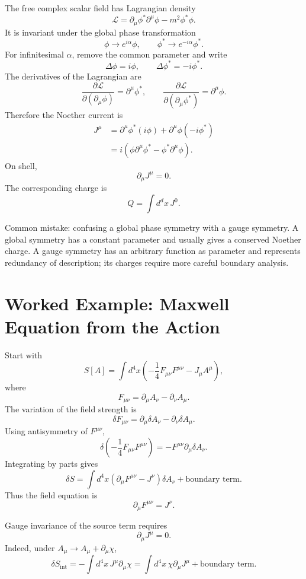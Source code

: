 The free complex scalar field has Lagrangian density
\[
    \mathcal{L}=\partial_\mu\phi^*\partial^\mu\phi-m^2\phi^*\phi.
\]
It is invariant under the global phase transformation
\[
    \phi\longrightarrow e^{i\alpha}\phi,
    \qquad
    \phi^*\longrightarrow e^{-i\alpha}\phi^*.
\]
For infinitesimal \(\alpha\), remove the common parameter and write
\[
    \Delta\phi=i\phi,
    \qquad
    \Delta\phi^*=-i\phi^*.
\]
The derivatives of the Lagrangian are
\[
    \frac{\partial\mathcal{L}}{\partial(\partial_\mu\phi)}=\partial^\mu\phi^*,
    \qquad
    \frac{\partial\mathcal{L}}{\partial(\partial_\mu\phi^*)}=\partial^\mu\phi.
\]
Therefore the Noether current is
\[
\begin{aligned}
    J^\mu
    &=\partial^\mu\phi^*(i\phi)+\partial^\mu\phi(-i\phi^*) \\
    &=i(\phi\partial^\mu\phi^*-\phi^*\partial^\mu\phi).
\end{aligned}
\]
On shell,
\[
    \partial_\mu J^\mu=0.
\]
The corresponding charge is
\[
    Q=\int d^d x\,J^0.
\]

\begin{remarkbox}
Common mistake: confusing a global phase symmetry with a gauge symmetry. A global
symmetry has a constant parameter and usually gives a conserved Noether charge. A
gauge symmetry has an arbitrary function as parameter and represents redundancy
of description; its charges require more careful boundary analysis.
\end{remarkbox}

\section{Worked Example: Maxwell Equation from the Action}

Start with
\[
    S[A]=\int d^4x\left(-\frac{1}{4}F_{\mu\nu}F^{\mu\nu}-J_\mu A^\mu\right),
\]
where
\[
    F_{\mu\nu}=\partial_\mu A_\nu-\partial_\nu A_\mu.
\]
The variation of the field strength is
\[
    \delta F_{\mu\nu}=\partial_\mu\delta A_\nu-\partial_\nu\delta A_\mu.
\]
Using antisymmetry of \(F^{\mu\nu}\),
\[
    \delta\left(-\frac{1}{4}F_{\mu\nu}F^{\mu\nu}\right)
    =-F^{\mu\nu}\partial_\mu\delta A_\nu.
\]
Integrating by parts gives
\[
    \delta S=\int d^4x\left(\partial_\mu F^{\mu\nu}-J^\nu\right)\delta A_\nu
    +\text{boundary term}.
\]
Thus the field equation is
\[
    \partial_\mu F^{\mu\nu}=J^\nu.
\]

Gauge invariance of the source term requires
\[
    \partial_\mu J^\mu=0.
\]
Indeed, under \(A_\mu\to A_\mu+\partial_\mu\chi\),
\[
    \delta S_{\mathrm{int}}
    =-\int d^4x\,J^\mu\partial_\mu\chi
    =\int d^4x\,\chi\partial_\mu J^\mu+\text{boundary term}.
\]

